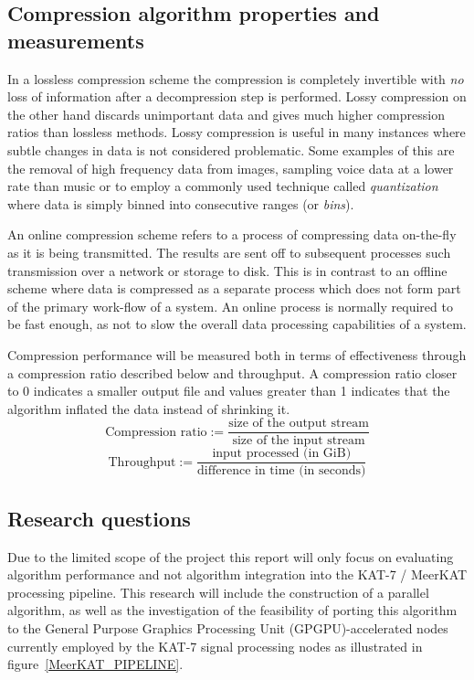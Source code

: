 \subsection{Compression algorithm properties and measurements}
In a lossless compression scheme the compression is completely invertible with \textit{no} loss of information after a decompression step is performed. Lossy
compression on the other hand discards unimportant data and gives much higher compression ratios than lossless methods. Lossy compression is useful in many
instances where subtle changes in data is not considered problematic. Some examples of this are the removal of high frequency data from images, sampling 
voice data at a lower rate than music or to employ a commonly used technique called \textit{quantization} where data is simply binned into consecutive ranges 
(or \textit{bins}).

An online compression scheme refers to a process of compressing data on-the-fly as it is being transmitted. The results are sent off to subsequent 
processes such transmission over a network or storage to disk. This is in contrast to an offline scheme where data is compressed as a separate process which does not
form part of the primary work-flow of a system. An online process is normally required to be fast enough, as not to slow the overall data processing capabilities of 
a system.

Compression performance will be measured both in terms of effectiveness through a compression ratio described below \cite[p. 10]{salomon2004data} and throughput. A 
compression ratio closer to 0 indicates a smaller output file and values greater than 1 indicates that the algorithm inflated the data instead of shrinking it.
\begin{equation}
 \text{Compression ratio} := \frac{\text{size of the output stream}}{\text{size of the input stream}}
\end{equation}
\begin{equation}
 \text{Throughput} := \frac{\text{input processed (in GiB)}}{\text{difference in time (in seconds)}}
\end{equation}
\subsection{Research questions}
Due to the limited scope of the project this report will only focus on evaluating algorithm performance and not algorithm integration into the KAT-7 / MeerKAT processing
pipeline. This research will include the construction of a parallel algorithm, as well as the investigation of the feasibility of porting this algorithm to the General 
Purpose Graphics Processing Unit (GPGPU)-accelerated nodes currently employed by the KAT-7 signal processing nodes as illustrated in figure~\ref{MeerKAT_PIPELINE}.

